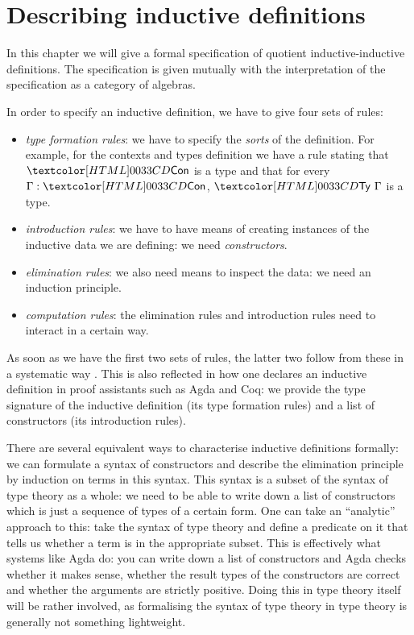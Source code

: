 \chapter{Describing inductive definitions}
\label{describing}

In this chapter we will give a formal specification of quotient
inductive-inductive definitions. The specification is given mutually
with the interpretation of the specification as a category of
algebras.

In order to specify an inductive definition, we have to give four sets
of rules:
\begin{itemize}
\item \emph{type formation rules}: we have to specify the \emph{sorts}
  of the definition. For example, for the contexts and types
  definition we have a rule stating that $\ttconty$ is a type and that
  for every $\Gamma : \ttconty$, $\tttyty\ \Gamma$ is a type.
\item \emph{introduction rules}: we have to have means of creating
  instances of the inductive data we are defining: we need
  \emph{constructors}.
\item \emph{elimination rules}: we also need means to inspect the
  data: we need an induction principle.
\item \emph{computation rules}: the elimination rules and introduction
  rules need to interact in a certain way.
\end{itemize}

As soon as we have the first two sets of rules, the latter two follow
from these in a systematic way \cite{Backhouse1989}. This is also
reflected in how one declares an inductive definition in proof
assistants such as Agda and Coq: we provide the type signature of the
inductive definition (its type formation rules) and a list of
constructors (its introduction rules).

There are several equivalent ways to characterise inductive
definitions formally: we can formulate a syntax of constructors and
describe the elimination principle by induction on terms in this
syntax. This syntax is a subset of the syntax of type theory as a
whole: we need to be able to write down a list of constructors which
is just a sequence of types of a certain form. One can take an
``analytic'' approach to this: take the syntax of type theory and
define a predicate on it that tells us whether a term is in the
appropriate subset. This is effectively what systems like Agda do: you
can write down a list of constructors and Agda checks whether it makes
sense, \eg whether the result types of the constructors are correct
and whether the arguments are strictly positive. Doing this in type
theory itself will be rather involved, as formalising the syntax of
type theory in type theory is generally not something lightweight.

